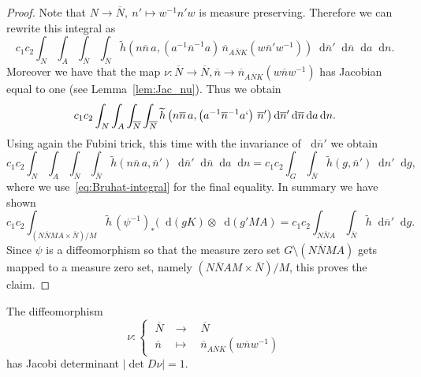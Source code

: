 \documentclass[AHL, Unicode, longabstracts, published]{cedram}
\newcommand{\til}{\widetilde}
\newcommand{\intd}{\mathop{}\!\mathrm{d}}
\newcommand{\bn}{{\overline{n}}}
\newcommand{\bN}{{\overline{N}}}
\begin{document}
\begin{proof}
Note that $N\to \bN,\ n'\mapsto w^{-1}n'w$ is measure preserving. Therefore we can rewrite this integral as
\[
c_1c_2\int_{N}\int_A \int_\bN\int_\bN\til h\left(n\overline n\,a, \left(a^{-1}\overline n^{-1}a\right)\,
\overline n_{A\bN K}\left(w\overline n' w^{-1}\right)\right)\intd \overline n'\intd \overline n\intd a\intd n.
\]
Moreover we have that the map $\nu:\bN\to\bN, \bn\to \bn_{A\bN K}(w\bn w^{-1})$ has Jacobian equal to one (see Lemma~\ref{lem:Jac_nu}). Thus we obtain
\[
c_1c_2\int_{N}\int_A \int_\bN\int_\bN\til h\left(n\overline n\,a, \left(a^{-1}\overline n^{-1}a`\right)\, \overline n'\right)\intd \overline n'\intd \overline n\intd a\intd n.
\]
Using again the Fubini trick, this time with the invariance of $\intd \bn'$ we obtain
\[
c_1c_2\int_{N}\int_A \int_\bN\int_\bN\til h(n\overline n\,a,\overline n')\intd \overline n'\intd \overline n\intd a\intd n =c_1c_2\int_{G}\int_\bN\til h(g,\overline n')\intd n'\intd g,
\]
where we use~\eqref{eq:Bruhat-integral} for the final equality. In summary we have shown
\[
c_1c_2\int_{(N\bN MA\times \bN)/M} \til h\,(\psi^{-1})_*(\intd(gK)\otimes\intd(g'MA) =c_1c_2\int_{N\bN A}\int_\bN\til h\intd \overline n'\intd g.
\]
Since $\psi$ is a diffeomorphism so that the measure zero set $G\setminus(N\bN MA)$ gets mapped to a measure zero set, namely $(N\bN AM\times \bN)/M$, this proves the claim.
\end{proof}


\begin{lemm}\label{lem:Jac_nu}
The diffeomorphism
\[
\nu:
\begin{cases}
\;\bN &\rightarrow\quad\bN\\
\;\bn &\mapsto\quad\bn_{A\bN K}\left(w\bn w^{-1}\right)
\end{cases}
\]
has Jacobi determinant $|\det D\nu|=1$.
\end{lemm}
\end{document}
